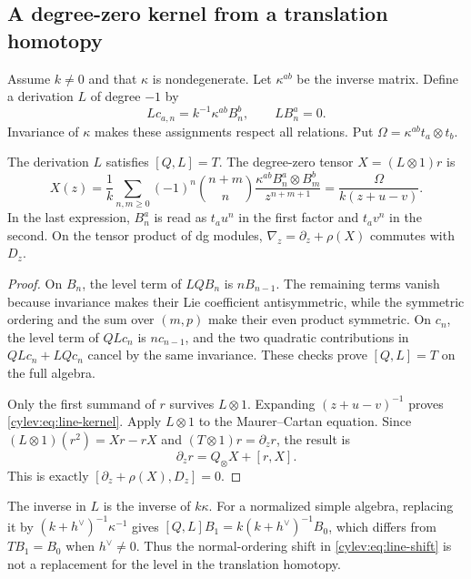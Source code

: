 \subsection{A degree-zero kernel from a translation homotopy}

Assume $k\ne0$ and that $\kappa$ is nondegenerate.
Let $\kappa^{ab}$ be the inverse matrix.
Define a derivation $L$ of degree $-1$ by
\[
 Lc_{a,n}=k^{-1}\kappa^{ab}B^b_n,\qquad LB^a_n=0.
\]
Invariance of $\kappa$ makes these assignments respect all relations.
Put $\Omega=\kappa^{ab}t_a\otimes t_b$.

\begin{proposition}\label{cylev:prop:line-kernel}
The derivation $L$ satisfies $[Q,L]=T$.
The degree-zero tensor $X=(L\otimes1)r$ is
\begin{equation}\label{cylev:eq:line-kernel}
 X(z)=\frac1k\sum_{n,m\ge0}(-1)^n\binom{n+m}{n}
              \frac{\kappa^{ab}B^a_n\otimes B^b_m}{z^{n+m+1}}
      =\frac{\Omega}{k(z+u-v)}.
\end{equation}
In the last expression, $B^a_n$ is read as $t_au^n$ in the first
factor and $t_av^n$ in the second.
On the tensor product of dg modules,
$\nabla_z=\partial_z+\rho(X)$ commutes with $D_z$.
\end{proposition}
\begin{proof}
On $B_n$, the level term of $LQB_n$ is $nB_{n-1}$.
The remaining terms vanish because invariance makes their Lie
coefficient antisymmetric, while the symmetric ordering and the sum
over $(m,p)$ make their even product symmetric.
On $c_n$, the level term of $QLc_n$ is $nc_{n-1}$, and the two
quadratic contributions in $QLc_n+LQc_n$ cancel by the same
invariance. These checks prove $[Q,L]=T$ on the full algebra.

Only the first summand of $r$ survives $L\otimes1$.
Expanding $(z+u-v)^{-1}$ proves \eqref{cylev:eq:line-kernel}.
Apply $L\otimes1$ to the Maurer--Cartan equation.
Since $(L\otimes1)(r^2)=Xr-rX$ and
$(T\otimes1)r=\partial_zr$, the result is
\[
 \partial_zr=Q_\otimes X+[r,X].
\]
This is exactly $[\partial_z+\rho(X),D_z]=0$.
\end{proof}

The inverse in $L$ is the inverse of $k\kappa$.
For a normalized simple algebra, replacing it by
$(k+h^\vee)^{-1}\kappa^{-1}$ gives
$[Q,L]B_1=k(k+h^\vee)^{-1}B_0$, which differs from $TB_1=B_0$
when $h^\vee\ne0$.
Thus the normal-ordering shift in
\eqref{cylev:eq:line-shift} is not a replacement for the level
in the translation homotopy.

